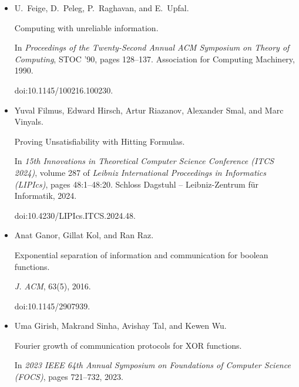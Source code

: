 \begin{itemize}
Tomás Feder, Eyal Kushilevitz, Moni Naor, and Noam Nisan.


Amortized communication complexity.


\emph{SIAM Journal on Computing}, 24(4):736–750, 1995.


doi:10.1137/S0097539792235864.





\item[] 
[24]

U. Feige, D. Peleg, P. Raghavan, and E. Upfal.


Computing with unreliable information.


In \emph{Proceedings of the Twenty-Second Annual ACM Symposium on
Theory of Computing}, STOC ’90, pages 128–137. Association for Computing
Machinery, 1990.


doi:10.1145/100216.100230.





\item[] 
[25]

Yuval Filmus, Edward Hirsch, Artur Riazanov, Alexander Smal, and Marc Vinyals.


Proving Unsatisfiability with Hitting Formulas.


In \emph{15th Innovations in Theoretical Computer Science Conference
(ITCS 2024)}, volume 287 of \emph{Leibniz International Proceedings in
Informatics (LIPIcs)}, pages 48:1–48:20. Schloss Dagstuhl – Leibniz-Zentrum
für Informatik, 2024.


doi:10.4230/LIPIcs.ITCS.2024.48.





\item[] 
[26]

Anat Ganor, Gillat Kol, and Ran Raz.


Exponential separation of information and communication for boolean
functions.


\emph{J. ACM}, 63(5), 2016.


doi:10.1145/2907939.





\item[] 
[27]

Uma Girish, Makrand Sinha, Avishay Tal, and Kewen Wu.


Fourier growth of communication protocols for XOR functions.


In \emph{2023 IEEE 64th Annual Symposium on Foundations of Computer
Science (FOCS)}, pages 721–732, 2023.



\end{itemize}
